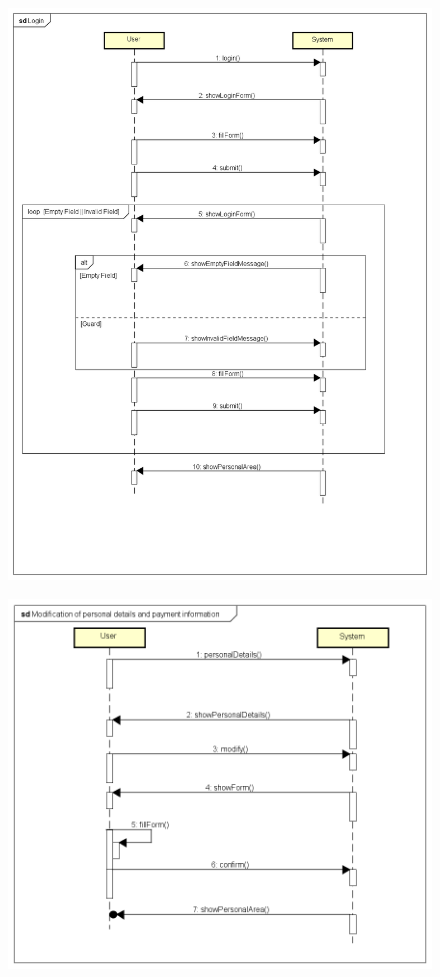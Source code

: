 \begin{figure}[H]
	\includegraphics[width = \textwidth]{img/sequence2}
\end{figure}


\begin{figure}[H]
	\includegraphics[width = \textwidth]{img/sequence3}
\end{figure}




